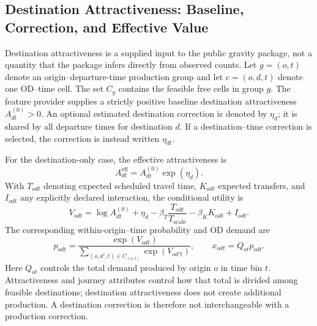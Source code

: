 \subsection{Destination Attractiveness: Baseline, Correction, and Effective Value}
\label{sec:destination-attractiveness}

Destination attractiveness is a supplied input to the public gravity package,
not a quantity that the package infers directly from observed counts.  Let
$g=(o,t)$ denote an origin--departure-time production group and let
$c=(o,d,t)$ denote one OD--time cell.  The set $C_g$ contains the feasible free
cells in group $g$.  The feature provider supplies a strictly positive baseline
destination attractiveness $A^{(0)}_{dt}>0$.  An optional estimated
destination correction is denoted by $\eta_d$; it is shared by all departure
times for destination $d$.  If a destination--time correction is selected, the
correction is instead written $\eta_{dt}$.

For the destination-only case, the effective attractiveness is
\begin{equation}
    A^{\mathrm{eff}}_{dt}
    = A^{(0)}_{dt}\exp(\eta_d).
\end{equation}
With $T_{odt}$ denoting expected scheduled travel time, $K_{odt}$ expected
transfers, and $I_{odt}$ any explicitly declared interaction, the conditional
utility is
\begin{equation}
    V_{odt}
    = \log A^{(0)}_{dt} + \eta_d
      -\beta_T\frac{T_{odt}}{T_{\mathrm{scale}}}
      -\beta_K K_{odt} + I_{odt}.
\end{equation}
The corresponding within-origin--time probability and OD demand are
\begin{equation}
    p_{odt}
    = \frac{\exp(V_{odt})}
      {\displaystyle\sum_{(o,d',t)\in C_{(o,t)}}\exp(V_{od't})},
    \qquad
    x_{odt}=Q_{ot}p_{odt}.
\end{equation}
Here $Q_{ot}$ controls the total demand produced by origin $o$ in time bin
$t$.  Attractiveness and journey attributes control how that total is divided
among feasible destinations; destination attractiveness does not create
additional production.  A destination correction is therefore not
interchangeable with a production correction.

